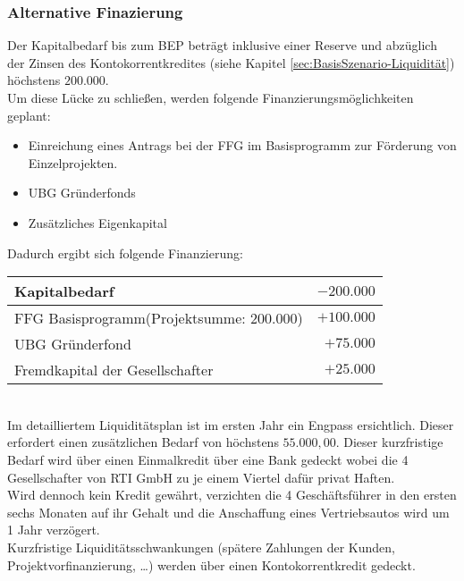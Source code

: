\subsubsection{Alternative Finazierung}
Der Kapitalbedarf bis zum BEP beträgt inklusive einer Reserve und abzüglich der Zinsen des Kontokorrentkredites (siehe Kapitel \ref{sec:BasisSzenario-Liquidität}) höchstens $200.000$\officialeuro.\\
Um diese Lücke zu schließen, werden folgende Finanzierungsmöglichkeiten geplant:
\begin{itemize}
	\item Einreichung eines Antrags bei der FFG im Basisprogramm zur Förderung von Einzelprojekten.
	\item UBG Gründerfonds
	\item Zusätzliches Eigenkapital
\end{itemize}
Dadurch ergibt sich folgende Finanzierung:\\
\begin{tabular}{l r}
	Kapitalbedarf & $-200.000$\officialeuro \\
	\hline
	FFG Basisprogramm(Projektsumme: $200.000$\officialeuro) & $+100.000$\officialeuro \\
	UBG Gründerfond & $+75.000$\officialeuro \\
	Fremdkapital der Gesellschafter & $+25.000$\officialeuro \\
	\bottomrule
\end{tabular}\\

\noindent Im detailliertem Liquiditätsplan ist im ersten Jahr ein Engpass ersichtlich. Dieser erfordert einen zusätzlichen Bedarf von höchstens $55.000,00$\officialeuro. Dieser kurzfristige Bedarf wird über einen Einmalkredit über eine Bank gedeckt wobei die 4 Gesellschafter von \textsf{RTI GmbH} zu je einem Viertel dafür privat Haften.\\
Wird dennoch kein Kredit gewährt, verzichten die 4 Geschäftsführer in den ersten sechs Monaten auf ihr Gehalt und die Anschaffung eines Vertriebsautos wird um 1 Jahr verzögert.\\

\noindent Kurzfristige Liquiditätsschwankungen (spätere Zahlungen der Kunden, Projektvorfinanzierung, …) werden über einen Kontokorrentkredit gedeckt.

\newpage
